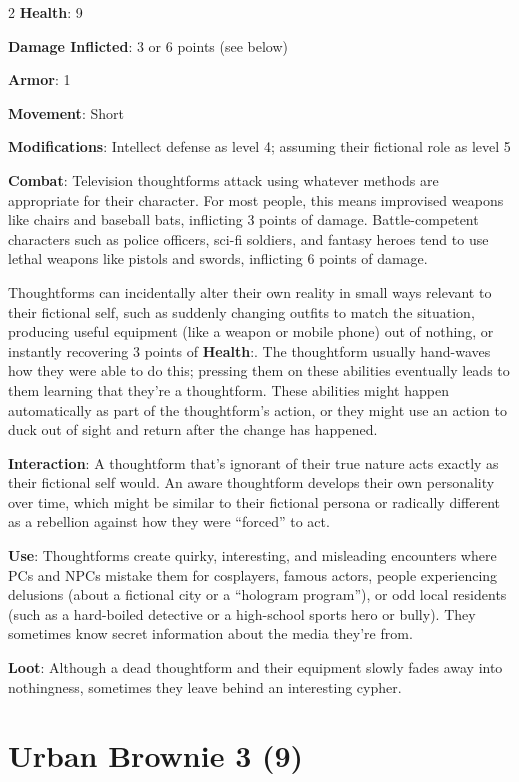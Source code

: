 \begin{multicols}{2}
\textbf{Health}: 9 

\textbf{Damage Inflicted}: 3 or 6 points (see below) 

\textbf{Armor}: 1 

\textbf{Movement}: Short 

\textbf{Modifications}: Intellect defense as level 4; assuming their fictional role as level 5 

\textbf{Combat}: Television thoughtforms attack using whatever methods are appropriate for their character. For most people, this means improvised weapons like chairs and baseball bats, inflicting 3 points of damage. Battle-competent characters such as police officers, sci-fi soldiers, and fantasy heroes tend to use lethal weapons like pistols and swords, inflicting 6 points of damage. 

Thoughtforms can incidentally alter their own reality in small ways relevant to their fictional self, such as suddenly changing outfits to match the situation, producing useful equipment (like a weapon or mobile phone) out of nothing, or instantly recovering 3 points of \textbf{Health}:. The thoughtform usually hand-waves how they were able to do this; pressing them on these abilities eventually leads to them learning that they’re a thoughtform. These abilities might happen automatically as part of the thoughtform’s action, or they might use an action to duck out of sight and return after the change has happened. 

\textbf{Interaction}: A thoughtform that’s ignorant of their true nature acts exactly as their fictional self would. An aware thoughtform develops their own personality over time, which might be similar to their fictional persona or radically different as a rebellion against how they were “forced” to act. 

\textbf{Use}: Thoughtforms create quirky, interesting, and misleading encounters where PCs and NPCs mistake them for cosplayers, famous actors, people experiencing delusions (about a fictional city or a “hologram program”), or odd local residents (such as a hard-boiled detective or a high-school sports hero or bully). They sometimes know secret information about the media they’re from. 

\textbf{Loot}: Although a dead thoughtform and their equipment slowly fades away into nothingness, sometimes they leave behind an interesting cypher.

\section{Urban Brownie 3 (9)}


\end{multicols}
